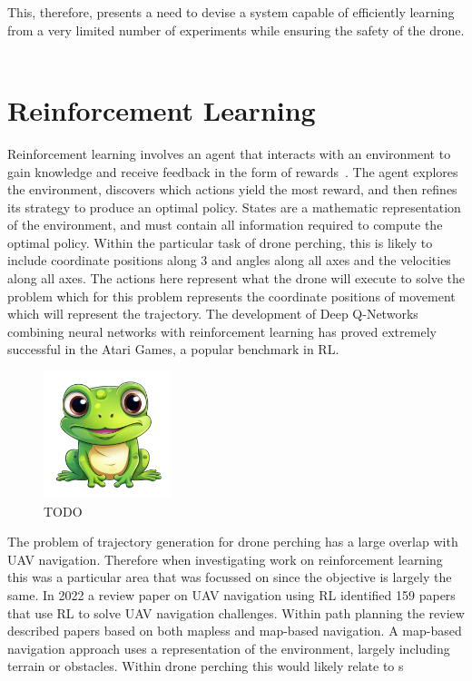 This, therefore, presents a need to devise a system capable of efficiently learning from a very limited number of experiments while ensuring the safety of the drone. \\\\

\section{Reinforcement Learning}
Reinforcement learning involves an agent that interacts with an environment to gain knowledge and receive feedback in the form of rewards~\cite{rlIntroSuttonBarlo}.
The agent explores the environment, discovers which actions yield the most reward, and then refines its strategy to produce an optimal policy.
States are a mathematic representation of the environment, and must contain all information required to compute the optimal policy.
Within the particular task of drone perching, this is likely to include coordinate positions along 3 and angles along all axes and the velocities along all axes.
The actions here represent what the drone will execute to solve the problem which for this problem represents the coordinate positions of movement which will represent the trajectory.
The development of Deep Q-Networks combining neural networks with reinforcement learning has proved extremely successful in the Atari Games, a popular benchmark in RL.

\begin{figure}[htbp]
  \centering
  \includegraphics[width=0.33\textwidth]{frog.png}
  \caption{TODO}
\label{fig:rl-intro-drone}
\end{figure}

The problem of trajectory generation for drone perching has a large overlap with UAV navigation.
Therefore when investigating work on reinforcement learning this was a particular area that was focussed on since the objective is largely the same.
In 2022 a review paper\cite{aerialNavReview} on UAV navigation using RL identified 159 papers that use RL to solve UAV navigation challenges.
Within path planning the review described papers based on both mapless and map-based navigation.
A map-based navigation approach uses a representation of the environment, largely including terrain or obstacles.
Within drone perching this would likely relate to s 

